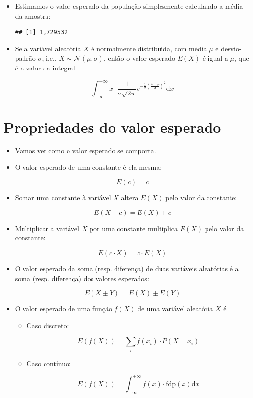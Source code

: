 \documentclass[
  11pt]{report}
\newenvironment{Shaded}{\begin{snugshade}}{\end{snugshade}}
\newcommand{\FunctionTok}[1]{\textcolor[rgb]{0.00,0.00,0.00}{#1}}
\newcommand{\NormalTok}[1]{#1}
\newcommand{\SpecialCharTok}[1]{\textcolor[rgb]{0.00,0.00,0.00}{#1}}
\renewenvironment{Shaded}{
    \begin{mdframed}[%
      roundcorner=2pt,%
      innerleftmargin=5pt,%
      innerrightmargin=5pt,%
      topline=true,%
      leftline=true,%
      rightline=true,%
      bottomline=true,%
      linewidth=0.5pt,%
      linecolor=black!20,%
      backgroundcolor=black!2,%
      skipabove=2ex,%
      skipbelow=2.5ex%
    ]%
  }
  {
    \end{mdframed}
  }
\begin{document}
\begin{itemize}
\item
  Estimamos o valor esperado da população simplesmente calculando a média da amostra:

\begin{Shaded}
\end{Shaded}

\begin{verbatim}
## [1] 1,729532
\end{verbatim}
\item
  Se a variável aleatória $X$ é normalmente distribuída, com média $\mu$ e desvio-padrão $\sigma$, i.e., $X \sim \mathcal{N}(\mu, \sigma)$, então o valor esperado $E(X)$ é igual a $\mu$, que é o valor da integral

  \[
  \int_{-\infty}^{+\infty} x \cdot{\frac {1}{\sigma {\sqrt {2\pi }}}}e^{-{\frac {1}{2}}\left({\frac {x-\mu }{\sigma }}\right)^{2}} \text{d}x
  \]
\end{itemize}

\hypertarget{propriedades-do-valor-esperado}{%
\section{Propriedades do valor esperado}\label{propriedades-do-valor-esperado}}

\begin{itemize}
\item
  Vamos ver como o valor esperado se comporta.
\item
  O valor esperado de uma constante é ela mesma:

  \[
  E(c) = c
  \]
\item
  Somar uma constante à variável $X$ altera $E(X)$ pelo valor da constante:

  \[
  E(X \pm c) = E(X) \pm c
  \]
\item
  Multiplicar a variável $X$ por uma constante multiplica $E(X)$ pelo valor da constante:

  \[
  E(c \cdot X) = c \cdot E(X)
  \]
\item
  O valor esperado da soma (resp. diferença) de duas variáveis aleatórias é a soma (resp. diferença) dos valores esperados:

  \[
  E(X \pm Y) = E(X) \pm E(Y)
  \]
\item
  O valor esperado de uma função $f(X)$ de uma variável aleatória $X$ é

  \begin{itemize}
  \item
    Caso discreto:

    \[
    E(f(X)) = \sum_i f(x_i) \cdot P(X = x_i)
    \]
  \item
    Caso contínuo:

    \[
    E(f(X)) = \int_{-\infty}^{+\infty} f(x) \cdot \text{fdp}(x) \text{d}x
    \]
  \end{itemize}
\end{itemize}
\end{document}
